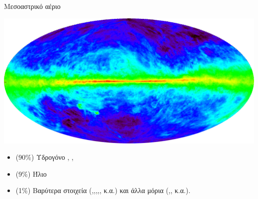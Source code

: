 \documentclass{beamer}
\begin{document}
\begin{frame}{Μεσοαστρικό αέριο}%
\begin{center}
	\includegraphics[width=1\linewidth]{../Document/Images/21}
\end{center}
		\begin{itemize}
			\item{(90\%) Υδρογόνο  , , }	
			\item{(9\%) Ήλιο }	
			\item{(1\%) Βαρύτερα στοιχεία  (,,,,, κ.α.) και άλλα μόρια (,, κ.α.).}
		\end{itemize}

\end{frame}
\end{document}
